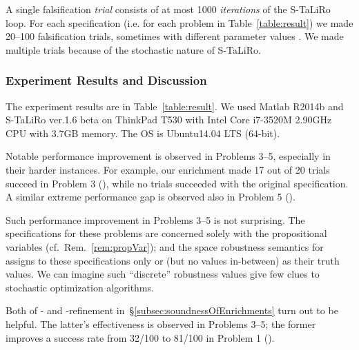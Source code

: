 \documentclass[envcountsect,orivec]{llncs} \usepackage{etex} \usepackage[]{graphicx}
\begin{document}
A single falsification \emph{trial} consists of at most 1000 \emph{iterations} of the S-TaLiRo
loop. For each specification  (i.e. for each problem in
Table~\ref{table:result}) we made 
20--100 falsification trials, 
sometimes
with different parameter values . We made multiple trials
because of the stochastic nature of S-TaLiRo.












































\subsubsection{Experiment Results and Discussion}
The experiment results are in Table~\ref{table:result}.
We used
Matlab R2014b and
S-TaLiRo ver.1.6 beta
on
ThinkPad T530 with Intel Core i7-3520M 2.90GHz CPU with 3.7GB memory.
The OS is Ubuntu14.04 LTS (64-bit).




 Notable performance improvement is observed in Problems 3--5, 
especially in their harder instances. For
example, our  enrichment made 17 out of 20 trials succeed in
Problem 3 (), while no trials succeeded with the original 
specification. A similar extreme performance gap is observed also in
Problem 5 ().

Such performance improvement in Problems 3--5  is not surprising. The
specifications for these problems
are concerned solely with the propositional variables
 (cf.\ Rem.~\ref{rem:propVar});
and the space
robustness semantics for  assigns to these specifications only 
or 
(but no values in-between) as their
truth 
values. We can imagine such ``discrete'' robustness values give few clues
to stochastic optimization algorithms.

Both of 
 - and
       -refinement
 in~\S{}\ref{subsec:soundnessOfEnrichments}
turn out to be helpful. The latter's effectiveness is observed in
Problems 3--5; the former improves a success rate from 32/100 to 81/100
in Problem 1 (). 
\end{document}
